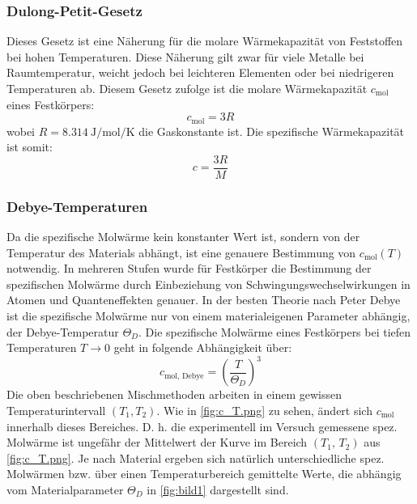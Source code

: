 \subsubsection{Dulong-Petit-Gesetz}
Dieses Gesetz ist eine Näherung für die molare Wärmekapazität von Feststoffen bei hohen Temperaturen. Diese Näherung gilt zwar für viele Metalle bei Raumtemperatur, weicht jedoch bei leichteren Elementen oder bei niedrigeren Temperaturen ab. Diesem Gesetz zufolge ist die molare Wärmekapazität \(c_{\text{mol}}\) eines Festkörpers:
\begin{equation}
    c_{\text{mol}}= 3R
    \label{Dulong_mol}
\end{equation}
wobei \(R=\qty{8,314}{\J\per\mol\per\K}\) die Gaskonstante ist. Die spezifische Wärmekapazität ist somit:
\begin{equation}
    c=\frac{3R}{M}
    \label{Dulong_x}
\end{equation}

\subsubsection{Debye-Temperaturen}
Da die spezifische Molwärme kein konstanter Wert ist, sondern von der Temperatur des Materials abhängt, ist eine genauere Bestimmung von \(c_{\text{mol}}(T)\) notwendig. In mehreren Stufen wurde für Festkörper die Bestimmung der spezifischen Molwärme durch Einbeziehung von Schwingungswechselwirkungen in Atomen und Quanteneffekten genauer. In der besten Theorie nach Peter Debye ist die spezifische Molwärme nur von einem materialeigenen Parameter abhängig, der Debye-Temperatur \(\Theta_D\). Die spezifische Molwärme eines Festkörpers bei tiefen Temperaturen \(T\rightarrow 0\) geht in folgende Abhängigkeit über:
\begin{equation}
    c_{\text{mol, Debye}}=\left(\frac{T}{\Theta_D}\right)^{3}
\end{equation} 
Die oben beschriebenen Mischmethoden arbeiten in einem gewissen Temperaturintervall \((T_1,T_2)\). Wie in \cref{fig:c_T.png} zu sehen, ändert sich \(c_{\text{mol}}\) innerhalb dieses Bereiches. D. h. die experimentell im Versuch gemessene spez. Molwärme ist ungefähr der Mittelwert der Kurve im Bereich \((T_1,\,T_2)\) aus \cref{fig:c_T.png}. Je nach Material ergeben sich natürlich unterschiedliche spez. Molwärmen bzw. über einen Temperaturbereich gemittelte Werte, die abhängig vom Materialparameter \(\Theta_D\) in \cref{fig:bild1} dargestellt sind.
\FloatBarrier


